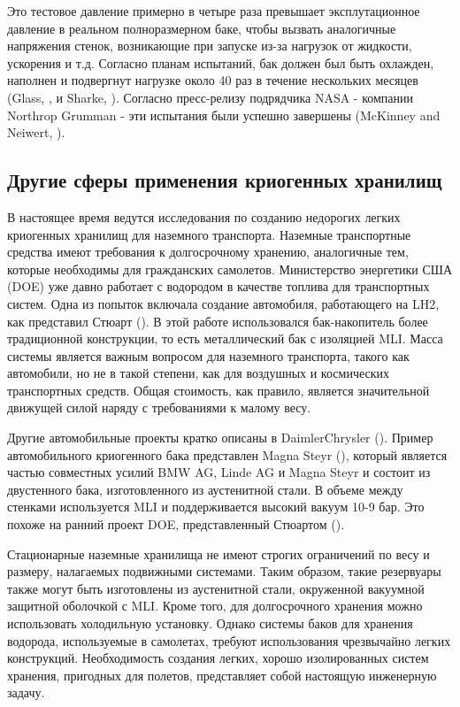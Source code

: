 Это тестовое давление примерно в четыре раза превышает эксплутационное давление в реальном полноразмерном баке, чтобы вызвать аналогичные напряжения стенок, возникающие при запуске из-за нагрузок от жидкости, ускорения и т.д. Согласно планам испытаний, бак должен был быть охлажден, наполнен и подвергнут нагрузке около 40 раз в течение нескольких месяцев (Glass, \cite{glass2004}, и Sharke, \cite{sharke2004}). Согласно пресс-релизу подрядчика NASA - компании Northrop Grumman - эти испытания были успешно завершены (McKinney and Neiwert, \cite{mckinneyneiwert2004}).

\subsection{Другие сферы применения криогенных хранилищ}\label{ch:overview:1:sec3:sub8}

В настоящее время ведутся исследования по созданию недорогих легких криогенных хранилищ для наземного транспорта. Наземные транспортные средства имеют требования к долгосрочному хранению, аналогичные тем, которые необходимы для гражданских самолетов. Министерство энергетики США (DOE) уже давно работает с водородом в качестве топлива для транспортных систем. Одна из попыток включала создание автомобиля, работающего на LH2, как представил Стюарт (\cite{stewart1982}). В этой работе использовался бак-накопитель более традиционной конструкции, то есть металлический бак с изоляцией MLI. Масса системы является важным вопросом для наземного транспорта, такого как автомобили, но не в такой степени, как для воздушных и космических транспортных средств. Общая стоимость, как правило, является значительной движущей силой наряду с требованиями к малому весу.

Другие автомобильные проекты кратко описаны в DaimlerChrysler (\cite{daimlerchrysle2004}). Пример автомобильного криогенного бака представлен Magna Steyr (\cite{magnasteyr2006}), который является частью совместных усилий BMW AG, Linde AG и Magna Steyr и состоит из двустенного бака, изготовленного из аустенитной стали. В объеме между стенками используется MLI и поддерживается высокий вакуум 10-9 бар. Это похоже на ранний проект DOE, представленный Стюартом (\cite{stewart1982}).

Стационарные наземные хранилища не имеют строгих ограничений по весу и размеру, налагаемых подвижными системами. Таким образом, такие резервуары также могут быть изготовлены из аустенитной стали, окруженной вакуумной защитной оболочкой с MLI. Кроме того, для долгосрочного хранения можно использовать холодильную установку. Однако системы баков для хранения водорода, используемые в самолетах, требуют использования чрезвычайно легких конструкций. Необходимость создания легких, хорошо изолированных систем хранения, пригодных для полетов, представляет собой настоящую инженерную задачу. 

